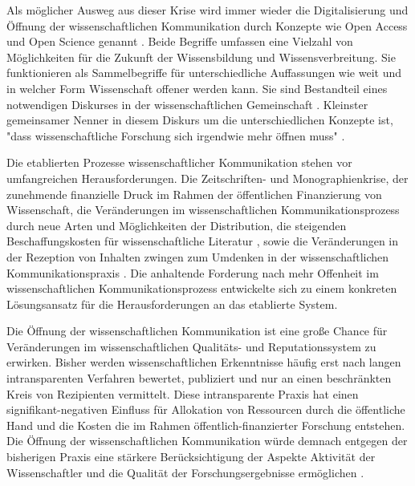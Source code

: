 Als möglicher Ausweg aus dieser Krise wird immer wieder die Digitalisierung und Öffnung der wissenschaftlichen Kommunikation durch Konzepte wie Open Access und Open Science genannt \cite{lewis_2015_future}. Beide Begriffe umfassen eine Vielzahl von Möglichkeiten für die Zukunft der Wissensbildung und Wissensverbreitung. Sie funktionieren als Sammelbegriffe für unterschiedliche Auffassungen wie weit und in welcher Form Wissenschaft offener werden kann. Sie sind Bestandteil eines notwendigen Diskurses in der wissenschaftlichen Gemeinschaft \cite{schulze_2013_open}. Kleinster gemeinsamer Nenner in diesem Diskurs um die unterschiedlichen Konzepte ist, "dass wissenschaftliche Forschung sich irgendwie mehr öffnen muss" \cite{cite:9}.

Die etablierten Prozesse wissenschaftlicher Kommunikation stehen vor umfangreichen Herausforderungen. Die Zeitschriften- und Monographienkrise, der zunehmende finanzielle Druck im Rahmen der öffentlichen Finanzierung von Wissenschaft, die Veränderungen im wissenschaftlichen Kommunikationsprozess durch neue Arten und Möglichkeiten der Distribution, die steigenden Beschaffungskosten für wissenschaftliche Literatur \cite{cite:17} \cite{muller_2010_open}, sowie die Veränderungen in der Rezeption von Inhalten \cite{holub_2013_reception} zwingen zum Umdenken in der wissenschaftlichen Kommunikationspraxis \cite{suchen}. Die anhaltende Forderung nach mehr Offenheit im wissenschaftlichen Kommunikationsprozess entwickelte sich zu einem konkreten Lösungsansatz für die Herausforderungen an das etablierte System.

Die Öffnung der wissenschaftlichen Kommunikation ist eine große Chance für Veränderungen im wissenschaftlichen Qualitäts- und Reputationssystem zu erwirken. Bisher werden wissenschaftlichen Erkenntnisse häufig erst nach langen intransparenten Verfahren bewertet, publiziert und nur an einen beschränkten Kreis von Rezipienten vermittelt. Diese intransparente Praxis hat einen signifikant-negativen Einfluss für Allokation von Ressourcen durch die öffentliche Hand und die Kosten die im Rahmen öffentlich-finanzierter Forschung entstehen. Die Öffnung der wissenschaftlichen Kommunikation würde demnach entgegen der bisherigen Praxis eine stärkere Berücksichtigung der Aspekte Aktivität der Wissenschaftler und die Qualität der Forschungsergebnisse ermöglichen \cite{suchen}.


